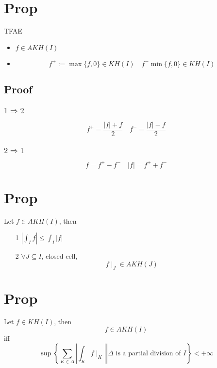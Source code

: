 \documentclass{book}
\newcommand{\abs}[1]{\left\lvert #1 \right\rvert}
\begin{document}
\section{Prop}TFAE
\begin{itemize}
    \item $f\in AKH(I)$
    \item $$f^+:=\max\{f,0\}\in KH(I)\quad f^-\min\{f,0\}\in KH(I)$$
\end{itemize}
\subsection*{Proof}
\subsubsection{$1\Rightarrow2$}
$$f^+=\frac{\abs f+f}2\quad f^-=\frac{\abs f-f}2$$
\subsubsection{$2\Rightarrow1$}
$$f=f^+-f^-\quad \abs f=f^++f^-$$
\section{Prop}Let $f\in AKH(I)$, then 
\begin{itemize}
    \item [1]$\abs{\int_If}\leq\int_I\abs f$
    \item [2]$\forall J\subseteq I$, closed cell, $$f\mid_J\in AKH(J)$$
\end{itemize}
\section{Prop}
Let $f\in KH(I)$, then $$f\in AKH(I)$$
iff
$$\sup\left\{\left.\sum\limits_{K\in \Delta}\abs{\int_Kf\mid_K}\right|\Delta\text{ is a partial division of }I\right\}<+\infty$$
\end{document}
